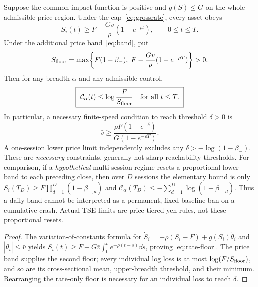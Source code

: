 \documentclass[review,hidelinks,onefignum,onetabnum]{siamonline250211}
\begin{document}
\begin{proposition}\label{prop:rate-band}
Suppose the common impact function is positive and $g(S)\le G$ on the whole admissible price region. Under the cap~\eqref{eq:grossrate}, every asset obeys
\begin{equation}\label{eq:rate-floor}
 S_i(t)\ge F-\frac{G\bar v}{\rho}(1-e^{-\rho t}),\qquad 0\le t\le T.
\end{equation}
Under the additional price band~\eqref{eq:band}, put
\begin{equation}\label{eq:twofloors}
 S_{\rm floor}=\max\!\left\{F(1-\beta_-),\;F-\frac{G\bar v}{\rho}(1-e^{-\rho T})\right\}>0.
\end{equation}
Then for any breadth $\alpha$ and any admissible control,
\begin{equation}\label{eq:constrained-crisis}
\boxed{\ \mathcal C_\alpha(t)\le \log\frac{F}{S_{\rm floor}}\quad\hbox{for all }t\le T.\ }
\end{equation}
In particular, a necessary finite-speed condition to reach threshold $\delta>0$ is
\begin{equation}\label{eq:min-speed}
\boxed{\ \bar v\ge\frac{\rho F(1-e^{-\delta})}{G(1-e^{-\rho T})}.\ }
\end{equation}
A one-session lower price limit independently excludes any $\delta> -\log(1-\beta_-)$. These are \emph{necessary} constraints, generally not sharp reachability thresholds. For comparison, if a \emph{hypothetical} multi-session regime resets a proportional lower band to each preceding close, then over $D$ sessions the elementary bound is only
$S_i(T_D)\ge F\prod_{d=1}^D(1-\beta_{-,d})$ and
$\mathcal C_\alpha(T_D)\le-\sum_{d=1}^D\log(1-\beta_{-,d})$.
Thus a daily band cannot be interpreted as a permanent, fixed-baseline ban on a cumulative crash. Actual TSE limits are price-tiered yen rules, not these proportional resets.
\end{proposition}
\begin{proof}
The variation-of-constants formula for $\dot S_i=-\rho(S_i-F)+g(S_i)\dot\theta_i$ and $|\dot\theta_i|\le\bar v$ yields $S_i(t)\ge F-G\bar v\int_0^t e^{-\rho(t-s)}\dd s$, proving \eqref{eq:rate-floor}. The price band supplies the second floor; every individual log loss is at most $\log(F/S_{\rm floor})$, and so are its cross-sectional mean, upper-breadth threshold, and their minimum. Rearranging the rate-only floor is necessary for an individual loss to reach $\delta$.
\end{proof}
\end{document}
